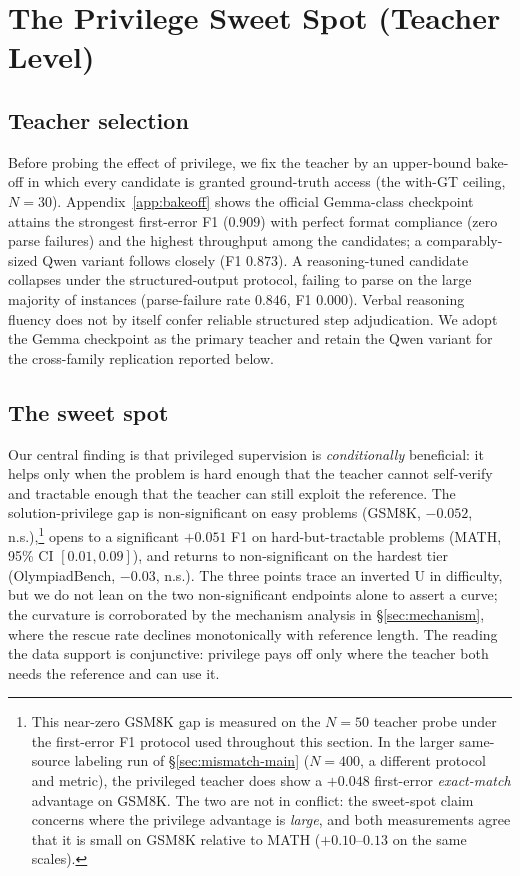 \documentclass{article}
\begin{document}
\section{The Privilege Sweet Spot (Teacher Level)}
\label{sec:sweetspot}

\subsection{Teacher selection}
Before probing the effect of privilege, we fix the teacher by an
upper-bound bake-off in which every candidate is granted ground-truth access
(the with-GT ceiling, $N=30$). Appendix~\ref{app:bakeoff} shows the
official Gemma-class checkpoint attains the strongest first-error F1
($0.909$) with perfect format compliance (zero parse failures) and the
highest throughput among the candidates; a comparably-sized Qwen variant
follows closely (F1 $0.873$). A reasoning-tuned candidate collapses under
the structured-output protocol, failing to parse on the large majority of
instances (parse-failure rate $0.846$, F1 $0.000$). Verbal reasoning fluency
does not by itself confer reliable structured step adjudication. We adopt the Gemma checkpoint as the primary teacher and
retain the Qwen variant for the cross-family replication reported below.

\subsection{The sweet spot}
Our central finding is that privileged supervision is \emph{conditionally}
beneficial: it helps only when the problem is hard enough that the teacher
cannot self-verify and tractable enough that the teacher can still exploit
the reference. The solution-privilege gap is non-significant on easy
problems (GSM8K, $-0.052$, n.s.),\footnote{This near-zero GSM8K gap is
measured on the $N=50$ teacher probe under the first-error F1 protocol used
throughout this section. In the larger same-source labeling run of
\S\ref{sec:mismatch-main} ($N=400$, a different protocol and metric), the
privileged teacher does show a $+0.048$ first-error \emph{exact-match}
advantage on GSM8K. The two are not in conflict: the sweet-spot claim
concerns where the privilege advantage is \emph{large}, and both measurements
agree that it is small on GSM8K relative to MATH ($+0.10$--$0.13$ on the same
scales).} opens to a significant $+0.051$ F1 on
hard-but-tractable problems (MATH, 95\% CI $[0.01, 0.09]$), and returns to
non-significant on the hardest tier (OlympiadBench, $-0.03$, n.s.). The
three points trace an inverted U in difficulty, but we do not lean on the
two non-significant endpoints alone to assert a curve; the curvature is
corroborated by the mechanism analysis in \S\ref{sec:mechanism}, where the
rescue rate declines monotonically with reference length. The reading the
data support is conjunctive: privilege pays off only where the teacher both
needs the reference and can use it.
\end{document}
